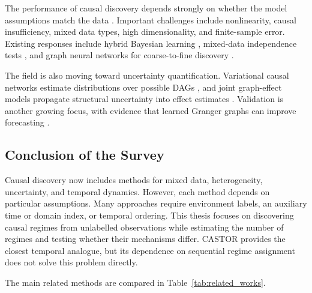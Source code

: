 The performance of causal discovery depends strongly on whether the model
assumptions match the data \cite{assaad2022survey}. Important challenges include
nonlinearity, causal insufficiency, mixed data types, high dimensionality, and
finite-sample error. Existing responses include hybrid Bayesian learning
\cite{kuipers2018efficient}, mixed-data independence tests
\cite{tsagris2018constraint}, and graph neural networks for coarse-to-fine discovery
\cite{cheng2023cuts}.

The field is also moving toward uncertainty quantification. Variational causal
networks estimate distributions over possible DAGs \cite{annadani2021variational},
and joint graph-effect models propagate structural uncertainty into effect estimates
\cite{castelletti2021structural}. Validation is another growing focus, with evidence
that learned Granger graphs can improve forecasting \cite{zhang2023causalformer}.

\subsection{Conclusion of the Survey}

Causal discovery now includes methods for mixed data, heterogeneity, uncertainty,
and temporal dynamics. However, each method depends on particular assumptions.
Many approaches require environment labels, an auxiliary time or domain index, or
temporal ordering. This thesis focuses on discovering causal regimes from
unlabelled observations while estimating the number of regimes and testing whether
their mechanisms differ. CASTOR provides the closest temporal analogue, but its
dependence on sequential regime assignment does not solve this problem directly.

The main related methods are compared in Table~\ref{tab:related_works}.

